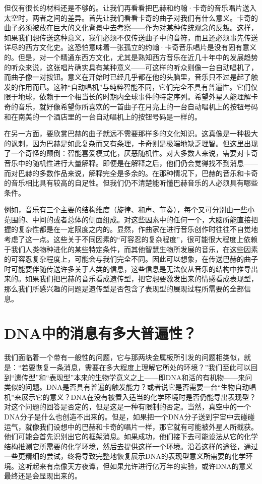 但仅有很长的材料还是不够的。让我们再看看把巴赫和约翰·卡奇的音乐唱片送入太空时，两者之间的差异。首先让我们看看卡奇的曲子对我们有什么意义。卡奇的曲子必须被放在巨大的文化背景中去考察——作为对某种传统观念的反叛。这样，如果我们想传送这种意义，我们必须不仅传送曲子中的音符，而且还必须事先传送详尽的西方文化史。这恐怕意味着一张孤立的约翰·卡奇音乐唱片是没有固有意义的。但是，对一个精通东西方文化，尤其是熟知西方音乐在近几十年中的发展趋势的听众来说，这张唱片确实具有某种意义——可这样的听众则像一台自动唱机了，而曲子像一对按钮。意义在开始时已经几乎都在他的头脑里，音乐只不过是起了触发的作用而已。这种“自动唱机”与纯粹智能不同，它们完全不具有普遍性。它们仅限于地球，依赖于一个相当长的时期内全球事件的特定序列。希望外星人能理解卡奇的音乐，就好像希望你所喜欢的一首曲子在月亮上的一台自动唱机上的按钮号码和在南美的一个酒店里的一台自动唱机上的按钮号码是一样的。

在另一方面，要欣赏巴赫的曲子就远不需要那样多的文化知识。这真像是一种极大的讽剌，因为巴赫是如此复杂而又有条理，卡奇则是极端地缺乏理智。但这里出现了一个奇怪的颠倒：智能喜爱模式化，厌恶随机性。对大多数人来说，需要对卡奇音乐中的随机性进行大量解释。即便是在解释之后，他们仍会觉得找不到消息——而对巴赫的多数作品来说，解释完全是多余的。在那种情况下，巴赫的音乐和卡奇的音乐相比具有较高的自足性。但我们仍不清楚能听懂巴赫音乐的人必须具有哪些条件。

例如，音乐有三个主要的结构维度（旋律、和声、节奏），每个又可分别由一些小范围的、中间的或者总体的侧面组成。对这些因素中的任何一个，大脑所能直接把握的复杂性都是在一定限度之内的。显然，作曲家在进行音乐创作时往往不自觉地考虑了这一点。这些关于不同因素的“可容忍的复杂程度”，很可能很大程度上依赖于我们人类物种进化的某些特定条件，而其他智慧生物所发展的音乐，在这些因素的可容忍复杂程度上，可能会与我们完全不同。因此可以想象，在传送巴赫的曲子时可能要伴随传送许多关于人类的信息，这些信息是无法仅从音乐的结构中推导出来的。如果我们把巴赫的音乐看成遗传型，把它想要激发出来的情感看成表现型，那么我们所感兴趣的问题是遗传型是否包含了表现型的展现过程所需要的全部信息。

\section{DNA中的消息有多大普遍性？}

我们面临着一个带有一般性的问题，它与那两块金属板所引发的问题相类似，就是：“若要恢复一条消息，需要在多大程度上理解它所处的环境？”我们至此可以回到“遗传型”和“表现型”本来的生物学意义之上——即DNA和活的有机物——来问类似的问题。DNA是否具有普遍的触发能力？或者说它是否需要一台“生物自动唱机”来展示它的意义？DNA在没有被置入适当的化学环境时是否仍能导出表现型？对这个问题的回答是否定的，但是这是一种有限制的否定。当然，真空中的一个DNA分子是什么也创造不出来的。但是，如果把一个DNA分子送到宇宙中去碰碰运气，就像我们设想中的巴赫和卡奇的唱片一样，那它就有可能被外星人所截获。他们可能会首先识别出它的框架消息。如果成功，他们接下去可能设法从它的化学结构推测它所需要的化学环境，然后去提供这样一个环境。沿着这样的途径，通过一些更精细的尝试，终将导致完整地恢复展示DNA的表现型意义所需要的化学环境。这听起来有点像天方夜谭，但如果允许进行亿万年的实验，或许DNA的意义最终还是会显现出来的。

